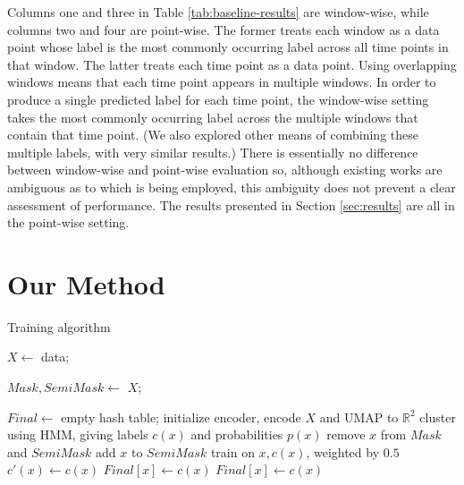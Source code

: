 \documentclass[wcp]{jmlr}
\begin{document}
Columns one and three in Table \ref{tab:baseline-results} are window-wise, while columns two and four are point-wise. The former treats each window as a data point whose label is the most commonly occurring label across all time points in that window. The latter treats each time point as a data point. Using overlapping windows means that each time point appears in multiple windows. In order to produce a single predicted label for each time point, the window-wise setting takes the most commonly occurring label across the multiple windows that contain that time point. (We also explored other means of combining these multiple labels, with very similar results.) There is essentially no difference between window-wise and point-wise evaluation so, although existing works are ambiguous as to which is being employed, this ambiguity does not prevent a clear assessment of performance. The results presented in Section \ref{sec:results} are all in the point-wise setting.


\section{Our Method} \label{sec:method}
 
\begin{algorithm}[t]
\caption {Training algorithm} \label{alg:method}
$X \gets$ data;

$Mask,SemiMask \gets$ $X$;

$Final \gets$ empty hash table;
 {
     {
         initialize encoder, encode $X$ and UMAP to $\mathbb{R}^{2}$
         cluster using HMM, giving labels $c(x)$ and probabilities $p(x)$
         {
             {
                 remove $x$ from $Mask$ and $SemiMask$
                }
            { add $x$ to $SemiMask$}
        }
         {
             {
                 {
                     train on $x,c(x)$, weighted by $0.5$
                }
            }
         $c'(x) \gets c(x)$
        }
    }
     {
         $Final[x] \gets c(x)$
    }
}
 {
         $Final[x] \gets c(x)$
}
\end{algorithm}
\end{document}
